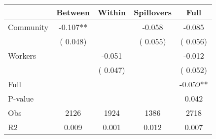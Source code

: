 
\begin{tabular}{l*{4}{c}}\hline&\multicolumn{1}{c}{Between}&\multicolumn{1}{c}{Within}&\multicolumn{1}{c}{Spillovers}&\multicolumn{1}{c}{Full}\\ \hline
 Community             &             -0.107**      &                                               &       -0.058 &        -0.085                            \\ 
                               &        (       0.048)           &                                       &       (       0.055)     &      (       0.056)                                           \\ 
 Workers       &                                               &       -0.051    &                                &            -0.012                            \\ 
                               &                                               & (       0.047)                  &                                        &      (       0.052)                                           \\ 
\hline                                                                                                                                                                                                                                            
 Full                  &                                               &                                               &                                        &            -0.059**                                     \\ 
 P-value               &                                               &                                               &                                        &             0.042                                           \\ 
 Obs                   &               2126               &       1924                       &       1386                &              2718                                               \\ 
 R2                    &                      0.009              &              0.001                      &              0.012               &                     0.007                                              \\ 
\hline \end{tabular}                                                                                                                                                                                                              